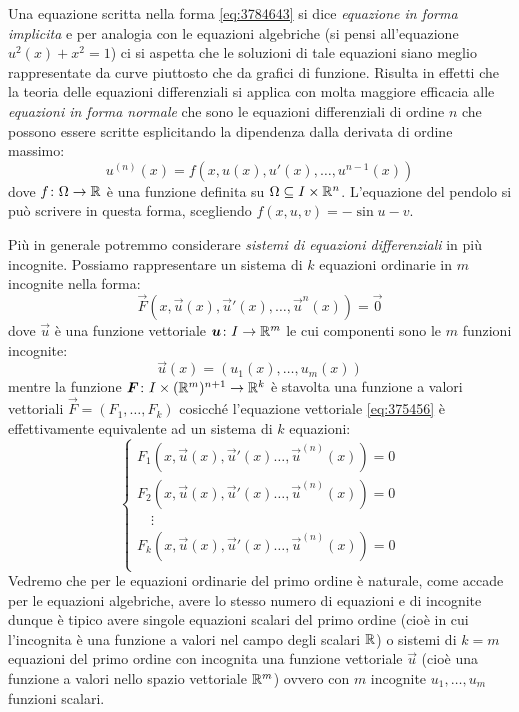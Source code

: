 Una equazione scritta nella forma \eqref{eq:3784643} si dice \emph{equazione in forma implicita}
%
%
e per analogia con le equazioni algebriche (si pensi all'equazione
$u^2(x) + x^2 = 1$) ci si aspetta che le soluzioni di tale equazioni siano
meglio rappresentate da curve piuttosto che da grafici di funzione.
Risulta in effetti che la teoria delle equazioni differenziali si applica con
molta maggiore efficacia alle \emph{equazioni in forma normale}
che sono le equazioni differenziali di ordine $n$ che possono essere scritte
esplicitando la dipendenza dalla derivata di ordine massimo:
\begin{equation}\label{eq:366793}
 u^{(n)}(x) = f(x, u(x), u'(x), \dots, u^{n-1}(x))
\end{equation}
dove $f\colon \Omega \to {\mathbb R}$ è una funzione definita su $\Omega\subseteq I\times {\mathbb R}^n$.
L'equazione del pendolo si può scrivere in questa forma,
scegliendo $f(x,u,v) = -\sin u - v$.

Più in generale potremmo considerare
\emph{sistemi di equazioni differenziali}
%
%
%
in più incognite.
Possiamo rappresentare un sistema di $k$ equazioni ordinarie in $m$ incognite nella forma:
\begin{equation}\label{eq:375456}
  \vec F(x, \vec u(x), \vec u'(x), \dots, \vec u^{n}(x)) = \vec 0
\end{equation}
dove $\vec u$ è una funzione vettoriale $\boldsymbol u \colon I \to {\mathbb R}^m$ 
le cui componenti sono le $m$ funzioni incognite:
\[
  \vec u(x) = (u_1(x), \dots, u_m(x))
\]
mentre la funzione $\boldsymbol F \colon I \times ({\mathbb R}^m)^{n+1} \to {\mathbb R}^k$ è stavolta
una funzione a valori vettoriali $\vec F = (F_1, \dots, F_k)$ cosicché l'equazione vettoriale
\eqref{eq:375456} è effettivamente equivalente ad un sistema di $k$ equazioni:
\[
\begin{cases}
F_1(x,\vec u(x), \vec u'(x)\dots, \vec u^{(n)}(x)) = 0\\
F_2(x,\vec u(x), \vec u'(x)\dots, \vec u^{(n)}(x)) = 0\\
\quad\vdots \\
F_k(x,\vec u(x), \vec u'(x)\dots, \vec u^{(n)}(x)) = 0\\
\end{cases}
\]
Vedremo che per le equazioni ordinarie del primo ordine è naturale,
come accade per le equazioni algebriche,
avere lo stesso numero di equazioni e di incognite dunque è tipico avere singole
equazioni scalari del primo ordine
(cioè in cui l'incognita è una funzione a valori nel campo
degli scalari ${\mathbb R}$)
o sistemi di $k=m$ equazioni del primo ordine con incognita una funzione
vettoriale $\vec u$ (cioè una funzione a valori nello spazio vettoriale ${\mathbb R}^m$)
ovvero con $m$ incognite $u_1,\dots, u_m$ funzioni scalari.

